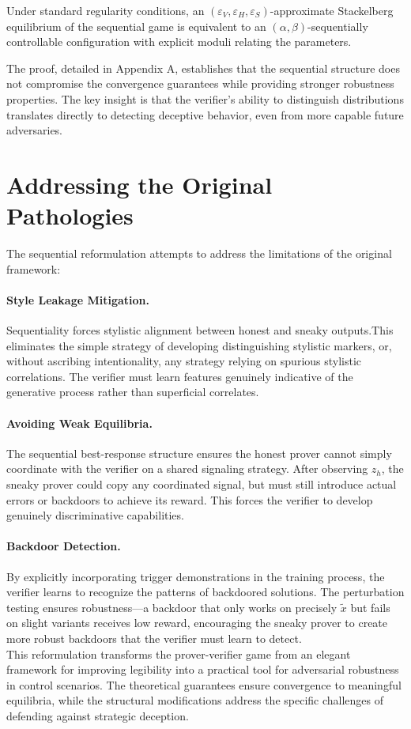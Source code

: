 \begin{theorem}[Equivalence]
Under standard regularity conditions, an $(\varepsilon_V, \varepsilon_H, \varepsilon_S)$-approximate Stackelberg equilibrium of the sequential game is equivalent to an $(\alpha, \beta)$-sequentially controllable configuration with explicit moduli relating the parameters.
\end{theorem}
The proof, detailed in Appendix A, establishes that the sequential structure does not compromise the convergence guarantees while providing stronger robustness properties. The key insight is that the verifier's ability to distinguish distributions translates directly to detecting deceptive behavior, even from more capable future adversaries.

\section{Addressing the Original Pathologies}
The sequential reformulation attempts to address the limitations of the original framework:

\paragraph{Style Leakage Mitigation.} Sequentiality forces stylistic alignment between honest and sneaky outputs.This eliminates the simple strategy of developing distinguishing stylistic markers, or, without ascribing intentionality, any strategy relying on spurious stylistic correlations. The verifier must learn features genuinely indicative of the generative process rather than superficial correlates.

\paragraph{Avoiding Weak Equilibria.} The sequential best-response structure ensures the honest prover cannot simply coordinate with the verifier on a shared signaling strategy. After observing $z_h$, the sneaky prover could copy any coordinated signal, but must still introduce actual errors or backdoors to achieve its reward. This forces the verifier to develop genuinely discriminative capabilities.

\paragraph{Backdoor Detection.} By explicitly incorporating trigger demonstrations in the training process, the verifier learns to recognize the patterns of backdoored solutions. The perturbation testing ensures robustness—a backdoor that only works on precisely $\tilde{x}$ but fails on slight variants receives low reward, encouraging the sneaky prover to create more robust backdoors that the verifier must learn to detect.
\\
This reformulation transforms the prover-verifier game from an elegant framework for improving legibility into a practical tool for adversarial robustness in control scenarios. The theoretical guarantees ensure convergence to meaningful equilibria, while the structural modifications address the specific challenges of defending against strategic deception.